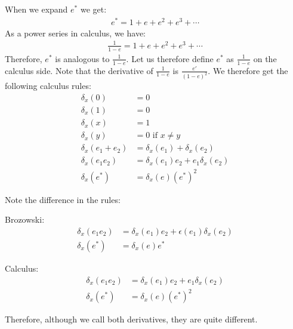\documentclass[a4paper, 11pt]{scrartcl}
\theoremstyle{definition}
\begin{document}
When we expand $e^*$ we get:
\begin{align*}
  e^* = 1 + e + e^2 + e^3 + \cdots
\end{align*}
As a power series in calculus, we have:
\begin{align*}
  \frac{1}{1 - e} = 1 + e + e^2 + e^3 + \cdots
\end{align*}
Therefore, $e^*$ is analogous to $\frac{1}{1 - e}$. Let us therefore define $e^*$ as $\frac{1}{1 - e}$ on the calculus side.
Note that the derivative of $\frac{1}{1 - e}$ is $\frac{e'}{(1 - e)^2}$.
We therefore get the following calculus rules:
\begin{align*}
  \delta_x(0)         &= 0 \\
  \delta_x(1)         &= 0 \\
  \delta_x(x)         &= 1 \\
  \delta_x(y)         &= 0 \text{ if } x \neq y \\
  \delta_x(e_1 + e_2) &= \delta_x(e_1) + \delta_x(e_2) \\
  \delta_x(e_1 e_2)   &= \delta_x(e_1) e_2 + e_1 \delta_x(e_2) \\
  \delta_x(e^*)       &= \delta_x(e) (e^*)^2
\end{align*}

Note the difference in the rules:\\[10pt]

\begin{minipage}{0.5\textwidth}
  \begin{center}
   Brozowski:
   \begin{align*}
     \delta_x(e_1 e_2) &= \delta_x(e_1) e_2 + \epsilon(e_1) \delta_x(e_2) \\
     \delta_x(e^*) &= \delta_x(e) e^*
   \end{align*}
  \end{center}
\end{minipage}
\begin{minipage}{0.5\textwidth}
  \begin{center}
   Calculus:
   \begin{align*}
     \delta_x(e_1 e_2) &= \delta_x(e_1) e_2 + e_1 \delta_x(e_2) \\
     \delta_x(e^*) &= \delta_x(e) (e^*)^2
   \end{align*}
  \end{center}
\end{minipage}

\bigskip
Therefore, although we call both derivatives, they are quite different.
\end{document}
